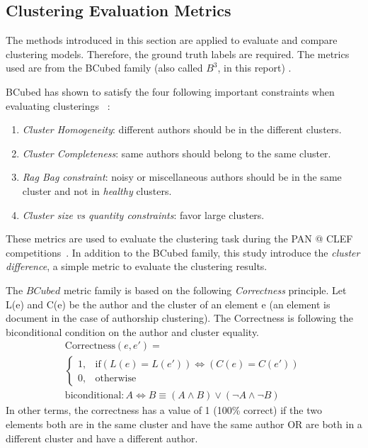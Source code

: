 \subsection{Clustering Evaluation Metrics \label{sec:clustering_evaluation_meterics}}

The methods introduced in this section are applied to evaluate and compare clustering models.
Therefore, the ground truth labels are required.
The metrics used are from the BCubed family (also called $B^3$, in this report) \cite{bcubed}.

BCubed has shown to satisfy the four following important constraints when evaluating clusterings \cite{bcubed}~:

\begin{enumerate}
  \item
  \textit{Cluster Homogeneity}: different authors should be in the different clusters.
  \item
  \textit{Cluster Completeness}: same authors should belong to the same cluster.
  \item
  \textit{Rag Bag constraint}: noisy or miscellaneous authors should be in the same cluster and not in \textit{healthy} clusters.
  \item
  \textit{Cluster size vs quantity constraints}: favor large clusters.
\end{enumerate}

These metrics are used to evaluate the clustering task during the PAN @ CLEF competitions~\cite{pan16}.
In addition to the BCubed family, this study introduce the \textit{cluster difference}, a simple metric to evaluate the clustering results.

\begin{definition}
  The $BCubed$ metric family is based on the following \textit{Correctness} principle.
  Let L(e) and C(e) be the author and the cluster of an element e (an element is document in the case of authorship clustering).
  The Correctness is following the biconditional condition on the author and cluster equality.
  \begin{gather*}
    \mathrm{Correctness}(e, e') = \\
    \begin{cases}
      1, & \mathrm{if} (L(e) = L(e')) \Longleftrightarrow (C(e) = C(e'))\\
      0, & \mathrm{otherwise}
    \end{cases} \\
    \mathrm{biconditional}: A \Longleftrightarrow B \equiv (A \land B) \lor (\neg A \land \neg B)
  \end{gather*}
  In other terms, the correctness has a value of 1 (100\% correct) if the two elements both are in the same cluster and have the same author OR are both in a different cluster and have a different author.
\end{definition}

